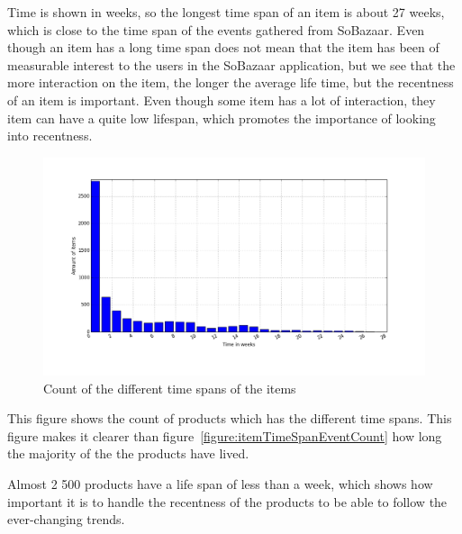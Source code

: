         Time is shown in weeks, so the longest time span of an item is about 27 weeks, which is close to the time span of the events gathered from SoBazaar.
        Even though an item has a long time span does not mean that the item has been of measurable interest to the users in the SoBazaar application, but we see that the more interaction on the item, the longer the average life time, but the recentness of an item is important.
        Even though some item has a lot of interaction, they item can have a quite low lifespan, which promotes the importance of looking into recentness.

    \begin{figure}[H]
        \includegraphics[width=5in]{image/itemTimespansdistribution.png}
        \centering
        \caption{Count of the different time spans of the items}
    \label{figure:itemLifes}
    \end{figure}
        This figure shows the count of products which has the different time spans.
        This figure makes it clearer than figure~\ref{figure:itemTimeSpanEventCount} how long the majority of the the products have lived.

        Almost 2 500 products have a life span of less than a week, which shows how important it is to handle the recentness of the products to be able to follow the ever-changing trends.


